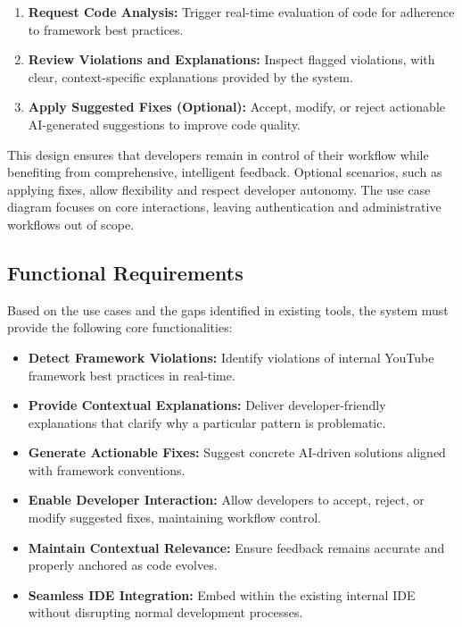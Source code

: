 \begin{spacing}{1.2}
\begin{enumerate}
\item \textbf{Request Code Analysis:} Trigger real-time evaluation of code for adherence to framework best practices.
\item \textbf{Review Violations and Explanations:} Inspect flagged violations, with clear, context-specific explanations provided by the system.
\item \textbf{Apply Suggested Fixes (Optional):} Accept, modify, or reject actionable AI-generated suggestions to improve code quality.
\end{enumerate}

This design ensures that developers remain in control of their workflow while benefiting from comprehensive, intelligent feedback. Optional scenarios, such as applying fixes, allow flexibility and respect developer autonomy. The use case diagram focuses on core interactions, leaving authentication and administrative workflows out of scope.

\subsection{Functional Requirements}

Based on the use cases and the gaps identified in existing tools, the system must provide the following core functionalities:

\begin{itemize}
\item \textbf{Detect Framework Violations:} Identify violations of internal YouTube framework best practices in real-time.
\item \textbf{Provide Contextual Explanations:} Deliver developer-friendly explanations that clarify why a particular pattern is problematic.
\item \textbf{Generate Actionable Fixes:} Suggest concrete AI-driven solutions aligned with framework conventions.
\item \textbf{Enable Developer Interaction:} Allow developers to accept, reject, or modify suggested fixes, maintaining workflow control.
\item \textbf{Maintain Contextual Relevance:} Ensure feedback remains accurate and properly anchored as code evolves.
\item \textbf{Seamless IDE Integration:} Embed within the existing internal IDE without disrupting normal development processes.
\end{itemize}


\end{spacing}
